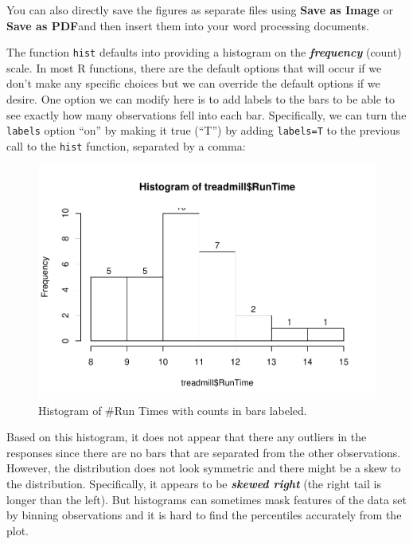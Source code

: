 \documentclass[]{book}
\newenvironment{Shaded}{\begin{snugshade}}{\end{snugshade}}
\newcommand{\KeywordTok}[1]{\textcolor[rgb]{0.13,0.29,0.53}{\textbf{{#1}}}}
\newcommand{\DataTypeTok}[1]{\textcolor[rgb]{0.13,0.29,0.53}{{#1}}}
\newcommand{\NormalTok}[1]{{#1}}
\begin{document}
You can also directly save the figures as separate files using
\textbf{Save as Image} or \textbf{Save as PDF}and then insert them into
your word processing documents.

The function \texttt{hist} defaults into providing a histogram on the
\textbf{\emph{frequency}} (count) scale. In most R functions, there are
the default options that will occur if we don't make any specific
choices but we can override the default options if we desire. One option
we can modify here is to add labels to the bars to be able to see
exactly how many observations fell into each bar. Specifically, we can
turn the \texttt{labels} option ``on'' by making it true (``T'') by
adding \texttt{labels=T} to the previous call to the \texttt{hist}
function, separated by a comma:



\begin{Shaded}
\end{Shaded}

\begin{figure}[htbp]
\centering
\includegraphics{GreenwoodBanner_files/figure-latex/Figure7-1.pdf}
\caption{\label{fig:Figure7}Histogram of \#Run Times with counts in bars labeled.}
\end{figure}

Based on this histogram, it does not appear that there any outliers in
the responses since there are no bars that are separated from the other
observations. However, the distribution does not look symmetric and
there might be a skew to the distribution. Specifically, it appears to
be \textbf{\emph{skewed right}} (the right tail is longer than the
left). But histograms can sometimes mask features of the data set by
binning observations and it is hard to find the percentiles accurately
from the plot.
\end{document}
